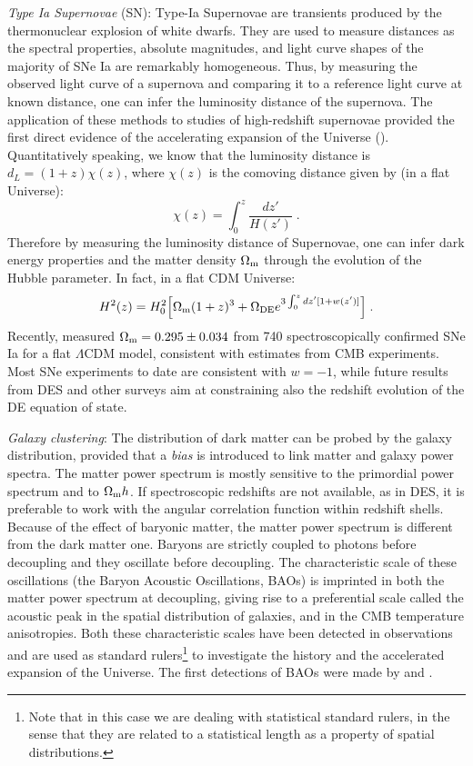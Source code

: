 \emph{Type Ia Supernovae} (SN): Type-Ia Supernovae are transients produced by the thermonuclear explosion of white dwarfs. They are used to measure distances as the spectral properties, absolute magnitudes, and light curve shapes of the majority of SNe Ia are remarkably homogeneous. Thus, by measuring the observed light curve of a supernova and comparing it to a reference light curve at known distance, one can infer the luminosity distance of the supernova. The application of these methods to studies of high-redshift supernovae provided the first direct evidence of the accelerating expansion of the Universe (\citealt{Riess,perlmutter}). Quantitatively speaking, we know that the luminosity distance is $d_L=(1+z)\chi(z)$, where $\chi(z)$ is the comoving distance given by (in a flat Universe):
\begin{equation}
\chi(z)= \int_0^z \frac{dz'}{H(z')}\;.
\end{equation}
Therefore by measuring the luminosity distance of Supernovae, one can infer dark energy properties and the matter density $\Omega_{\rm m}$ through the evolution of the Hubble parameter. In fact, in a flat CDM Universe:
\begin{equation}
H^2(z)=H_0^2 \Big[\Omega_{\rm m}(1+z)^3+\Omega_{\rm DE}e^{3\int_0^zdz'[1+w(z')]}\Big]\;.\label{Ez}
\end{equation}
Recently, \citet{betoule} measured $\Omega_{\rm m}=0.295\pm0.034$ from 740 spectroscopically confirmed SNe Ia for a flat $\Lambda$CDM model, consistent with estimates from CMB experiments. Most SNe experiments to date are consistent with $w=-1$, while future results from DES and other surveys aim at constraining also the redshift evolution of the DE equation of state.

\emph{Galaxy clustering}: The distribution of dark matter can be probed by the galaxy distribution, provided that a \emph{bias} is introduced to link matter and galaxy power spectra. The matter power spectrum is mostly sensitive to the primordial power spectrum and to $\Omega_{\rm m} h$. If spectroscopic redshifts are not available, as in DES, it is preferable to work with the angular correlation function within redshift shells. Because of the effect of baryonic matter, the matter power spectrum is different from the dark matter one. Baryons are strictly coupled to photons before decoupling and they oscillate before decoupling. The characteristic scale of these oscillations (the Baryon Acoustic Oscillations, BAOs) is imprinted in both the matter power spectrum at decoupling, giving rise to a preferential scale called the acoustic peak in the spatial distribution of galaxies, and in the CMB temperature anisotropies. Both these characteristic scales have been detected in observations and are used as standard rulers\footnote{Note that in this case we are dealing with statistical standard rulers, in the sense that they are related to a statistical length as a property of spatial distributions.} to investigate the history and the accelerated expansion of the Universe. The first detections of BAOs were made by \citet{Eisenstein} and \citet{cole}. 

